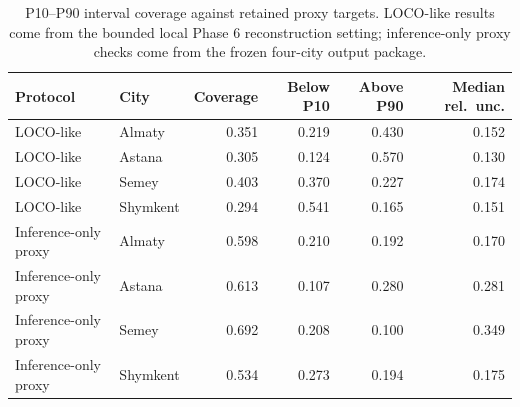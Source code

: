\begin{table}[H]
\centering
\small
\caption{P10--P90 interval coverage against retained proxy targets. LOCO-like results come from the bounded local Phase 6 reconstruction setting; inference-only proxy checks come from the frozen four-city output package.}
\label{tab:interval-coverage}
\begin{tabular}{p{2.5cm}lrrrr}
\toprule
Protocol & City & Coverage & Below P10 & Above P90 & Median rel.\ unc. \\
\midrule
LOCO-like & Almaty   & 0.351 & 0.219 & 0.430 & 0.152 \\
LOCO-like & Astana   & 0.305 & 0.124 & 0.570 & 0.130 \\
LOCO-like & Semey    & 0.403 & 0.370 & 0.227 & 0.174 \\
LOCO-like & Shymkent & 0.294 & 0.541 & 0.165 & 0.151 \\
Inference-only proxy & Almaty   & 0.598 & 0.210 & 0.192 & 0.170 \\
Inference-only proxy & Astana   & 0.613 & 0.107 & 0.280 & 0.281 \\
Inference-only proxy & Semey    & 0.692 & 0.208 & 0.100 & 0.349 \\
Inference-only proxy & Shymkent & 0.534 & 0.273 & 0.194 & 0.175 \\
\bottomrule
\end{tabular}
\end{table}
